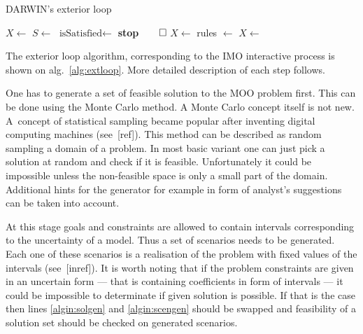 \begin{algorithm}
\caption{DARWIN's exterior loop}\label{alg:extloop}
  \begin{algorithmic}[1]
    \State $X \gets$  \label{algin:solgen}
    \State $S \gets$  \label{algin:scengen}
    \Loop
     \label{algin:evstart} 
    \State {} 
    \EndFor{} \label{algin:evstop}
    \State $\text{isSatisfied} \gets$  \label{algin:dmshow}
    \State \textbf{stop}$\qed$ 
    \Else
    \State $X \gets$  \label{algin:dmmark}
    \EndIf
    \State rules $\gets$  \label{algin:rules}
    \State $X \gets$   \label{algin:intloop}
    \EndLoop{}
  \end{algorithmic}
\end{algorithm}


The exterior loop algorithm, corresponding to the IMO interactive process is
shown on alg.~\ref{alg:extloop}. More detailed description of each step
follows.

One has to generate a set of feasible solution to the MOO problem first. This
can be done using the Monte Carlo method. A Monte Carlo concept itself is not
new. A~concept of statistical sampling became popular after inventing digital
computing machines (see~[ref]). This method can be described as random
sampling a domain of a problem. In most basic variant one can just pick a
solution at random and check if it is feasible. Unfortunately it could be
impossible unless the non-feasible space is only a small part of the
domain. Additional hints for the generator for example in form of analyst's
suggestions can be taken into account.

At this stage goals and constraints are allowed to contain intervals
corresponding to the uncertainty of a model. Thus a set of scenarios needs to
be generated. Each one of these scenarios is a realisation of the problem with
fixed values of the intervals (see~[inref]). It is worth noting that if the
problem constraints are given in an uncertain form --- that is containing
coefficients in form of intervals --- it could be impossible to determinate if
given solution is possible. If that is the case then lines \ref{algin:solgen}
and \ref{algin:scengen} should be swapped and feasibility of a solution set
should be checked on generated scenarios.

